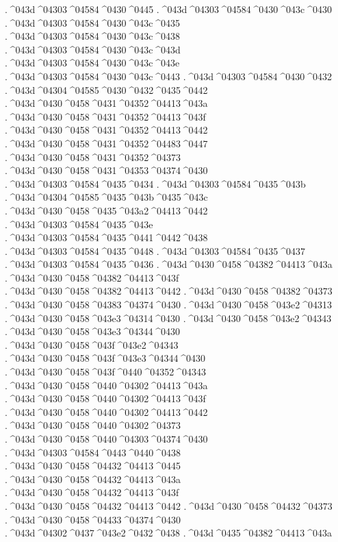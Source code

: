 {.^^^^043d^^^^04303^^^^04584^^^^0430^^^^0445
.^^^^043d^^^^04303^^^^04584^^^^0430^^^^043c^^^^0430
.^^^^043d^^^^04303^^^^04584^^^^0430^^^^043c^^^^0435
.^^^^043d^^^^04303^^^^04584^^^^0430^^^^043c^^^^0438
.^^^^043d^^^^04303^^^^04584^^^^0430^^^^043c^^^^043d
.^^^^043d^^^^04303^^^^04584^^^^0430^^^^043c^^^^043e
.^^^^043d^^^^04303^^^^04584^^^^0430^^^^043c^^^^0443
.^^^^043d^^^^04303^^^^04584^^^^0430^^^^0432
.^^^^043d^^^^04304^^^^04585^^^^0430^^^^0432^^^^0435^^^^0442
.^^^^043d^^^^0430^^^^0458^^^^0431^^^^04352^^^^04413^^^^043a
.^^^^043d^^^^0430^^^^0458^^^^0431^^^^04352^^^^04413^^^^043f
.^^^^043d^^^^0430^^^^0458^^^^0431^^^^04352^^^^04413^^^^0442
.^^^^043d^^^^0430^^^^0458^^^^0431^^^^04352^^^^04483^^^^0447
.^^^^043d^^^^0430^^^^0458^^^^0431^^^^04352^^^^04373
.^^^^043d^^^^0430^^^^0458^^^^0431^^^^04353^^^^04374^^^^0430
.^^^^043d^^^^04303^^^^04584^^^^0435^^^^0434
.^^^^043d^^^^04303^^^^04584^^^^0435^^^^043b
.^^^^043d^^^^04304^^^^04585^^^^0435^^^^043b^^^^0435^^^^043c
.^^^^043d^^^^0430^^^^0458^^^^0435^^^^043a2^^^^04413^^^^0442
.^^^^043d^^^^04303^^^^04584^^^^0435^^^^043e
.^^^^043d^^^^04303^^^^04584^^^^0435^^^^0441^^^^0442^^^^0438
.^^^^043d^^^^04303^^^^04584^^^^0435^^^^0448
.^^^^043d^^^^04303^^^^04584^^^^0435^^^^0437
.^^^^043d^^^^04303^^^^04584^^^^0435^^^^0436
.^^^^043d^^^^0430^^^^0458^^^^04382^^^^04413^^^^043a
.^^^^043d^^^^0430^^^^0458^^^^04382^^^^04413^^^^043f
.^^^^043d^^^^0430^^^^0458^^^^04382^^^^04413^^^^0442
.^^^^043d^^^^0430^^^^0458^^^^04382^^^^04373
.^^^^043d^^^^0430^^^^0458^^^^04383^^^^04374^^^^0430
.^^^^043d^^^^0430^^^^0458^^^^043e2^^^^04313
.^^^^043d^^^^0430^^^^0458^^^^043e3^^^^04314^^^^0430
.^^^^043d^^^^0430^^^^0458^^^^043e2^^^^04343
.^^^^043d^^^^0430^^^^0458^^^^043e3^^^^04344^^^^0430
.^^^^043d^^^^0430^^^^0458^^^^043f^^^^043e2^^^^04343
.^^^^043d^^^^0430^^^^0458^^^^043f^^^^043e3^^^^04344^^^^0430
.^^^^043d^^^^0430^^^^0458^^^^043f^^^^0440^^^^04352^^^^04343
.^^^^043d^^^^0430^^^^0458^^^^0440^^^^04302^^^^04413^^^^043a
.^^^^043d^^^^0430^^^^0458^^^^0440^^^^04302^^^^04413^^^^043f
.^^^^043d^^^^0430^^^^0458^^^^0440^^^^04302^^^^04413^^^^0442
.^^^^043d^^^^0430^^^^0458^^^^0440^^^^04302^^^^04373
.^^^^043d^^^^0430^^^^0458^^^^0440^^^^04303^^^^04374^^^^0430
.^^^^043d^^^^04303^^^^04584^^^^0443^^^^0440^^^^0438
.^^^^043d^^^^0430^^^^0458^^^^04432^^^^04413^^^^0445
.^^^^043d^^^^0430^^^^0458^^^^04432^^^^04413^^^^043a
.^^^^043d^^^^0430^^^^0458^^^^04432^^^^04413^^^^043f
.^^^^043d^^^^0430^^^^0458^^^^04432^^^^04413^^^^0442
.^^^^043d^^^^0430^^^^0458^^^^04432^^^^04373
.^^^^043d^^^^0430^^^^0458^^^^04433^^^^04374^^^^0430
.^^^^043d^^^^04302^^^^0437^^^^043e2^^^^0432^^^^0438
.^^^^043d^^^^0435^^^^04382^^^^04413^^^^043a
}

